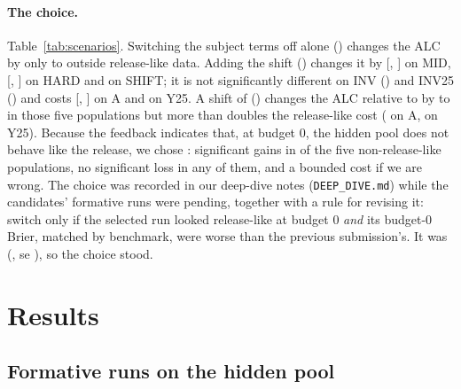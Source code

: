 \documentclass{article}
\begin{document}
\paragraph{The choice.} Table~\ref{tab:scenarios}. Switching the subject terms off alone (\FmNosubjId{}) changes the ALC by only \DdNosubjGainWorst{} to \DdNosubjGainBest{} outside release-like data. Adding the \SelIntercept{} shift (\SelId{}) changes it by \DdMidSelMean{} [\DdMidSelLo, \DdMidSelHi] on MID, \DdHardSelMean{} [\DdHardSelLo, \DdHardSelHi] on HARD and \DdShiftSelMean{} on SHIFT; it is not significantly different on INV (\DdInvSelMean) and INV25 (\DdInvYSelMean) and costs \DdASelMean{} [\DdASelLo, \DdASelHi] on A and \DdYSelMean{} on Y25. A shift of \MhundIntercept{} (\FmMhundId{}) changes the ALC relative to \SelId{} by \DdMhundMinusSelBest{} to \DdMhundMinusSelWorst{} in those five populations but more than doubles the release-like cost (\DdAMhundMean{} on A, \DdYMhundMean{} on Y25). Because the feedback indicates that, at budget 0, the hidden pool does not behave like the release, we chose \SelId: significant gains in \DdSelNSigGain{} of the five non-release-like populations, no significant loss in any of them, and a bounded cost if we are wrong. The choice was recorded in our deep-dive notes (\texttt{DEEP\_DIVE.md}) while the candidates' formative runs were pending, together with a rule for revising it: switch only if the selected run looked release-like at budget 0 \emph{and} its budget-0 Brier, matched by benchmark, were worse than the previous submission's. It was \FmSelRuleBZero{} (\FmMatchSelShipBZeroMean, se \FmMatchSelShipBZeroSe), so the choice stood.

\section{Results}
\label{sec:results}

\subsection{Formative runs on the hidden pool}
\label{sec:formative}
\end{document}
